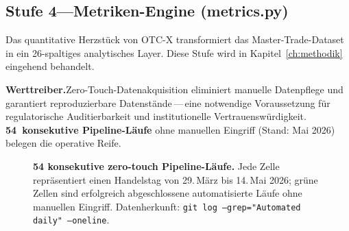 \documentclass[11pt, a4paper, oneside, openany]{report}
\newcommand{\code}[1]{{\codefont\small\textcolor{DeepNavy}{#1}}}
\begin{document}
\subsection{Stufe 4\;---\;Metriken-Engine (\code{metrics.py})}

Das quantitative Herzstück von OTC-X transformiert das Master-Trade-Dataset in ein 26-spaltiges analytisches Layer. Diese Stufe wird in Kapitel~\ref{ch:methodik} eingehend behandelt.

\begin{insightbox}
\textbf{Werttreiber.}\;Zero-Touch-Datenakquisition eliminiert manuelle Datenpflege und garantiert reproduzierbare Datenstände\,---\,eine notwendige Voraussetzung für regulatorische Auditierbarkeit und institutionelle Vertrauenswürdigkeit. \textbf{54~konsekutive Pipeline-Läufe} ohne manuellen Eingriff (Stand: Mai 2026) belegen die operative Reife.
\end{insightbox}

\begin{figure}[H]
\centering
{}
\caption{\textbf{54 konsekutive zero-touch Pipeline-Läufe.} Jede Zelle repräsentiert einen Handelstag von 29.\,März bis 14.\,Mai 2026; grüne Zellen sind erfolgreich abgeschlossene automatisierte Läufe ohne manuellen Eingriff. Datenherkunft: \texttt{git log --grep="Automated daily" --oneline}.}
\label{fig:automation-calendar}
\end{figure}
\end{document}
